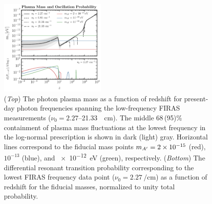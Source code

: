 \documentclass[prd,aps,10pt,nofootinbib,twocolumn,superscriptaddress,preprintnumbers,balancelastpage,longbibliography]{revtex4-1}
\begin{document}
%
\begin{figure}[htbp]
    \centering
    \includegraphics[width=0.47\textwidth]{plots/m_Ap_single_LN}
    \caption{({\it Top}) The photon plasma mass as a function of redshift for present-day photon frequencies spanning the low-frequency FIRAS measurements ($\nu_0=2.27$--\SI{21.33}{\per\centi\meter}). The middle 68\,(95)\% containment of plasma mass fluctuations at the lowest frequency in the log-normal prescription is shown in dark (light) gray. Horizontal lines correspond to the fiducial mass points $m_{A^\prime}=2\times10^{-15}$ (red), $10^{-13}$ (blue), and \SI{e-12}{\eV} (green), respectively. ({\it Bottom}) The differential resonant transition probability corresponding to the lowest FIRAS frequency data point ($\nu_0=\SI{2.27}{\per\centi\meter}$) as a function of redshift for the fiducial masses, normalized to unity total probability. } 
    \label{fig:plasma_mass}
\end{figure}
%
\end{document}
